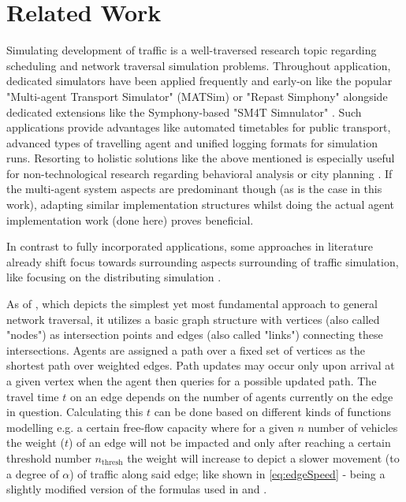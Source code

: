 \section{Related Work}\label{sec:relatedWork}

Simulating development of traffic is a well-traversed research topic regarding scheduling and network traversal simulation problems.
Throughout application, dedicated simulators have been applied frequently and early-on like the popular "Multi-agent Transport Simulator" (MATSim) \cite{sezen2003modeling} or "Repast Simphony" \cite{zargayouna2013agent} alongside dedicated extensions like the Symphony-based "SM4T Simnulator" \cite{ksontini2016building}.
Such applications provide advantages like automated timetables for public transport, advanced types of travelling agent and unified logging formats for simulation runs.
Resorting to holistic solutions like the above mentioned is especially useful for non-technological research regarding behavioral analysis or city planning \cite{brakewood2018literature}. If the multi-agent system aspects are predominant though (as is the case in this work), adapting similar implementation structures whilst doing the actual agent implementation work (done here) proves beneficial.

In contrast to fully incorporated applications, some approaches in literature already shift focus towards surrounding aspects surrounding of traffic simulation, like focusing on the distributing simulation \cite{mastio2015towards}.

As of \cite{mastio2015towards}, which depicts the simplest yet most fundamental approach to general network traversal, it utilizes a basic graph structure with vertices (also called "nodes") as intersection points and edges (also called "links") connecting these intersections. Agents are assigned a path over a fixed set of vertices as the shortest path over weighted edges. Path updates may occur only upon arrival at a given vertex when the agent then queries for a possible updated path.
The travel time $t$ on an edge depends on the number of agents currently on the edge in question. Calculating this $t$ can be done based on different kinds of functions modelling e.g. a certain free-flow capacity where for a given $n$ number of vehicles the weight ($t$) of an edge will not be impacted and only after reaching a certain threshold number $n_{\text{thresh}}$ the weight will increase to depict a slower movement (to a degree of $\alpha$) of traffic along said edge; like shown in \autoref{eq:edgeSpeed} - being a slightly modified version of the formulas used in \cite{mastio2015towards} and \cite{ksontini2016building}.

